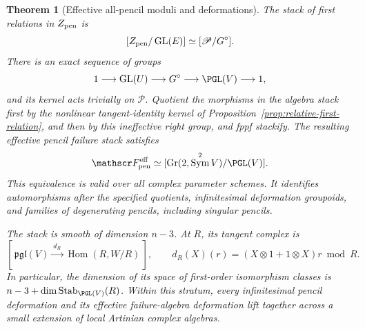 \documentclass[11pt,reqno]{amsart}
\numberwithin{equation}{section}
\newtheorem{theorem}{Theorem}[section]
\theoremstyle{definition}\newtheorem{definition}[theorem]{Definition}
\theoremstyle{remark}\newtheorem{remark}[theorem]{Remark}
\DeclareMathOperator{\Sym}{Sym}\DeclareMathOperator{\Gr}{Gr}
\DeclareMathOperator{\Hom}{Hom}\DeclareMathOperator{\Tot}{Tot}
\begin{document}
\begin{theorem}[Effective all-pencil moduli and deformations]
\label{thm:pencil-stack-equivalence}
The stack of first relations in \(Z_{\rm pen}\) is
\begin{equation}\label{eq:pencil-stack-before-rigidification}
 [Z_{\rm pen}/\operatorname{GL}(E)]\simeq
                         [\mathscr P/G^\circ].
\end{equation}
There is an exact sequence of groups
\begin{equation}\label{eq:pencil-ineffective-group}
 1\longrightarrow\operatorname{GL}(U)\longrightarrow G^\circ
                 \longrightarrow\PGL(V)\longrightarrow1,
\end{equation}
and its kernel acts trivially on \(\mathscr P\).
Quotient the morphisms in the algebra stack first by the
nonlinear tangent-identity kernel of
Proposition~\ref{prop:relative-first-relation}, and then by this
ineffective right group, and fppf stackify.  The resulting
\emph{effective pencil failure stack} satisfies
\begin{equation}\label{eq:effective-pencil-stack}
       \mathscr F_{\rm pen}^{\rm eff}\simeq
                [\Gr(2,\Sym^2V)/\PGL(V)].
\end{equation}
This equivalence is valid over all complex parameter schemes.
It identifies automorphisms after the specified quotients,
infinitesimal deformation groupoids, and families of degenerating
pencils, including singular pencils.

The stack is smooth of dimension \(n-3\).  At \(R\), its tangent
complex is
\begin{equation}\label{eq:pencil-tangent-complex}
 [\,\mathfrak{pgl}(V)\xrightarrow{\ d_R\ }\Hom(R,W/R)\,],
 \qquad d_R(X)(r)=(X\otimes1+1\otimes X)r\bmod R.
\end{equation}
In particular, the dimension of its space of first-order
isomorphism classes is \(n-3+\dim\operatorname{Stab}_{\PGL(V)}(R)\).
Within this stratum, every infinitesimal pencil deformation and
its effective failure-algebra deformation lift together across a
small extension of local Artinian complex algebras.
\end{theorem}
\end{document}
